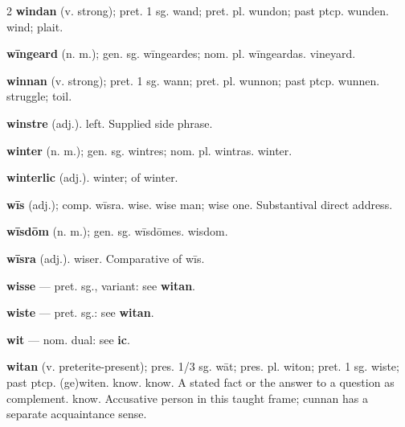 \begin{multicols*}{2}
\textbf{windan} (v. strong); pret. 1 sg. wand; pret. pl. wundon; past ptcp. wunden. wind; plait.\par
\textbf{wīngeard} (n. m.); gen. sg. wīngeardes; nom. pl. wīngeardas. vineyard.\par
\textbf{winnan} (v. strong); pret. 1 sg. wann; pret. pl. wunnon; past ptcp. wunnen. struggle; toil.\par
\textbf{winstre} (adj.). left. Supplied side phrase.\par
\textbf{winter} (n. m.); gen. sg. wintres; nom. pl. wintras. winter.\par
\textbf{winterlic} (adj.). winter; of winter.\par
\textbf{wīs} (adj.); comp. wīsra. wise. wise man; wise one. Substantival direct address.\par
\textbf{wīsdōm} (n. m.); gen. sg. wīsdōmes. wisdom.\par
\textbf{wīsra} (adj.). wiser. Comparative of wīs.\par
\textbf{wisse} — pret. sg., variant: see \textbf{witan}.\par
\textbf{wiste} — pret. sg.: see \textbf{witan}.\par
\textbf{wit} — nom. dual: see \textbf{ic}.\par
\textbf{witan} (v. preterite-present); pres. 1/3 sg. wāt; pres. pl. witon; pret. 1 sg. wiste; past ptcp. (ge)witen. know. know. A stated fact or the answer to a question as complement. know. Accusative person in this taught frame; cunnan has a separate acquaintance sense.\par

\end{multicols*}
